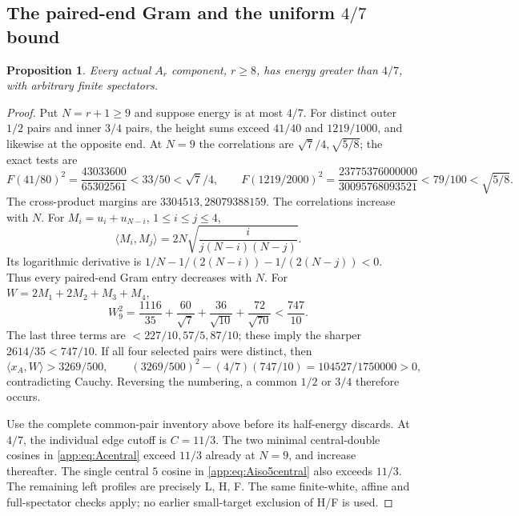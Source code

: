 \documentclass[11pt]{article}
\newtheorem{proposition}[theorem]{Proposition}
\theoremstyle{definition}
\theoremstyle{remark}
\newcommand{\ip}[2]{\langle #1,#2\rangle}
\begin{document}
\subsection{The paired-end Gram and the uniform \(4/7\) bound}
\label{app:Afour}
\begin{proposition}
Every actual \(A_r\) component, \(r\geq8\), has energy
greater than \(4/7\), with arbitrary finite spectators.
\end{proposition}
\begin{proof}
Put \(N=r+1\geq9\) and suppose energy is at most \(4/7\).
For distinct outer \(1/2\) pairs and inner \(3/4\) pairs,
the height sums exceed \(41/40\) and \(1219/1000\),
and likewise at the opposite end. At \(N=9\) the
correlations are \(\sqrt7/4,\sqrt{5/8}\); the exact tests are
\[
 F(41/80)^2=\frac{43033600}{65302561}
 <33/50<\sqrt7/4,\qquad
 F(1219/2000)^2=\frac{23775376000000}{30095768093521}
 <79/100<\sqrt{5/8}.
\]
The cross-product margins are \(3304513,28079388159\).
The correlations increase with \(N\).
For \(M_i=u_i+u_{N-i}\), \(1\leq i\leq j\leq4\),
\[
 \ip{M_i}{M_j}=2N\sqrt{\frac{i}{j(N-i)(N-j)}}.
\]
Its logarithmic derivative is
\(1/N-1/(2(N-i))-1/(2(N-j))<0\).
Thus every paired-end Gram entry decreases with \(N\).
For \(W=2M_1+2M_2+M_3+M_4\),
\[
 W_9^2=\frac{1116}{35}+\frac{60}{\sqrt7}
       +\frac{36}{\sqrt{10}}+\frac{72}{\sqrt{70}}
 <\frac{747}{10}.
\]
The last three terms are \(<227/10,57/5,87/10\);
these imply the sharper \(2614/35<747/10\).
If all four selected pairs were distinct, then
\[
 \ip{x_A}{W}>3269/500,\qquad
 (3269/500)^2-(4/7)(747/10)=104527/1750000>0,
\]
contradicting Cauchy. Reversing the numbering, a common
\(1/2\) or \(3/4\) therefore occurs.

Use the complete common-pair inventory above before its
half-energy discards. At \(4/7\), the individual edge
cutoff is \(C=11/3\). The two minimal central-double
cosines in \eqref{app:eq:Acentral} exceed \(11/3\)
already at \(N=9\), and increase thereafter.
The single central \(5\) cosine in
\eqref{app:eq:Aiso5central} also exceeds \(11/3\).
The remaining left profiles are precisely L, H, F.
The same finite-white, affine and full-spectator checks
apply; no earlier small-target exclusion of H/F is used.


\end{proof}
\end{document}
